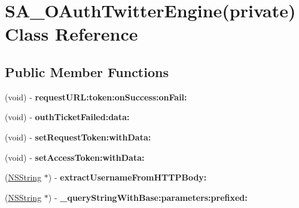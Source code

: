 \hypertarget{interface_s_a___o_auth_twitter_engine_07private_08}{
\section{\-S\-A\-\_\-\-O\-Auth\-Twitter\-Engine(private) \-Class \-Reference}
\label{interface_s_a___o_auth_twitter_engine_07private_08}
}
\subsection*{\-Public \-Member \-Functions}
\begin{DoxyCompactItemize}
\item 
\hypertarget{interface_s_a___o_auth_twitter_engine_07private_08_a5f07b20adbc687675d8b13ab96a8372a}{
(void) -\/ {\bfseries request\-U\-R\-L\-:token\-:on\-Success\-:on\-Fail\-:}}
\label{interface_s_a___o_auth_twitter_engine_07private_08_a5f07b20adbc687675d8b13ab96a8372a}

\item 
\hypertarget{interface_s_a___o_auth_twitter_engine_07private_08_a9f67923fd8f8493f2358891e76e60682}{
(void) -\/ {\bfseries outh\-Ticket\-Failed\-:data\-:}}
\label{interface_s_a___o_auth_twitter_engine_07private_08_a9f67923fd8f8493f2358891e76e60682}

\item 
\hypertarget{interface_s_a___o_auth_twitter_engine_07private_08_abf015228461b234cbf2f2cf3c0247542}{
(void) -\/ {\bfseries set\-Request\-Token\-:with\-Data\-:}}
\label{interface_s_a___o_auth_twitter_engine_07private_08_abf015228461b234cbf2f2cf3c0247542}

\item 
\hypertarget{interface_s_a___o_auth_twitter_engine_07private_08_a1a0e8f39dff6ba8e287180749f1628af}{
(void) -\/ {\bfseries set\-Access\-Token\-:with\-Data\-:}}
\label{interface_s_a___o_auth_twitter_engine_07private_08_a1a0e8f39dff6ba8e287180749f1628af}

\item 
\hypertarget{interface_s_a___o_auth_twitter_engine_07private_08_a576a2074d5edfa01fe9d7cadcf347d19}{
(\hyperlink{class_n_s_string}{\-N\-S\-String} $\ast$) -\/ {\bfseries extract\-Username\-From\-H\-T\-T\-P\-Body\-:}}
\label{interface_s_a___o_auth_twitter_engine_07private_08_a576a2074d5edfa01fe9d7cadcf347d19}

\item 
\hypertarget{interface_s_a___o_auth_twitter_engine_07private_08_a28b22d1d6615b9fe78ae76a226277c68}{
(\hyperlink{class_n_s_string}{\-N\-S\-String} $\ast$) -\/ {\bfseries \-\_\-query\-String\-With\-Base\-:parameters\-:prefixed\-:}}
\label{interface_s_a___o_auth_twitter_engine_07private_08_a28b22d1d6615b9fe78ae76a226277c68}


\end{DoxyCompactItemize}
